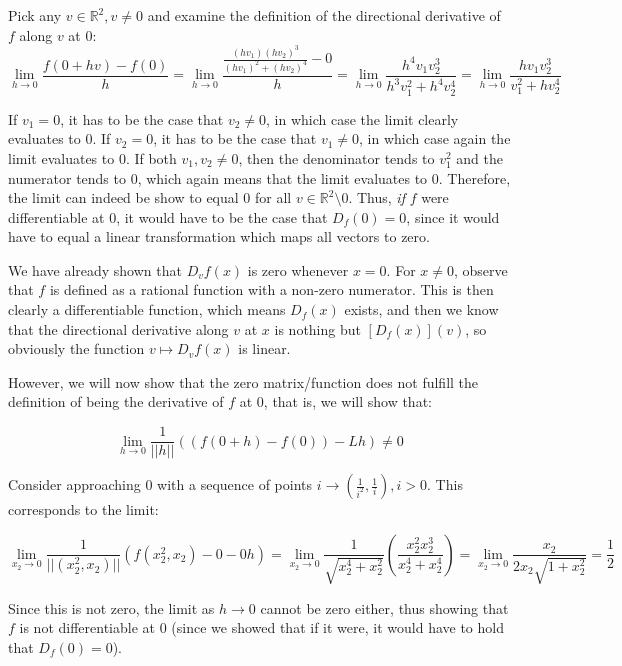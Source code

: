 \begin{solution}

    Pick any $v \in \mathbb{R}^2, v \neq 0$ and examine the definition of the directional derivative of $f$ along $v$ at 0:
    $$\lim_{h \rightarrow 0} \frac{f(0 + hv) - f(0)}{h} = \lim_{h \rightarrow 0} \frac{\frac{(hv_1)(hv_2)^3}{(hv_1)^2 + (hv_2)^4} - 0}{h} = \lim_{h \rightarrow 0} \frac{h^4 v_1 v_2^3}{h^3v_1^2 + h^4 v_2^4} = \lim_{h \rightarrow 0} \frac{h v_1 v_2^3}{v_1^2 + hv_2^4}$$

    If $v_1 = 0$, it has to be the case that $v_2 \neq 0$, in which case the limit clearly evaluates to 0. 
    If $v_2  = 0$, it has to be the case that $v_1 \neq 0$, in which case again the limit evaluates to 0.
    If both $v_1, v_2 \neq 0$, then the denominator tends to $v_1^2$ and the numerator tends to 0, which again means that the limit evaluates to 0.
    Therefore, the limit can indeed be show to equal 0 for all $v \in \mathbb{R}^2 \setminus {0}$.
    Thus, \textit{if} $f$ were differentiable at 0, it would have to be the case that $D_f(0) = 0$, since it would have to equal a linear transformation which maps all vectors to zero.
    
    We have already shown that $D_v f(x)$ is zero whenever $x = 0$. For $x \neq 0$, observe that $f$ is defined as a rational function with a non-zero numerator. 
    This is then clearly a differentiable function, which means $D_f (x)$ exists, and then we know that the directional derivative along $v$ at $x$ is nothing but $[D_f(x)](v)$, so obviously the function $v \mapsto D_v f(x)$ is linear.

    However, we will now show that the zero matrix/function does not fulfill the definition of being the derivative of $f$ at 0, that is, we will show that:

    $$\lim_{h \rightarrow 0}\frac{1}{\lvert \lvert h \rvert \rvert}( (f(0 + h) - f(0)) - Lh ) \neq 0$$

    Consider approaching $0$ with a sequence of points $i \rightarrow (\frac{1}{i^2}, \frac{1}{i}), i > 0$. This corresponds to the limit:

    $$\lim_{x_2 \rightarrow 0} \frac{1}{\lvert \lvert (x_2^2, x_2) \rvert \rvert}(f(x_2^2, x_2) - 0 - 0h) = \lim_{x_2 \rightarrow 0}\frac{1}{\sqrt{x_2^4 + x_2^2}}(\frac{x_2^2x_2^3}{x_2^4 + x_2^4}) = \lim_{x_2 \rightarrow 0} \frac{x_2}{2x_2\sqrt{1 + x_2^2}} = \frac{1}{2}$$

    Since this is not zero, the limit as $h \rightarrow 0$ cannot be zero either, thus showing that $f$ is not differentiable at 0 (since we showed that if it were, it would have to hold that $D_f(0) = 0$).
    
\end{solution}

